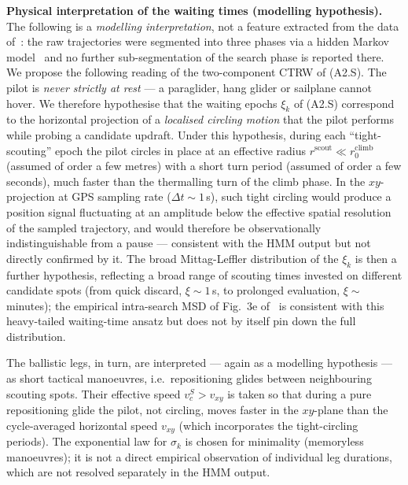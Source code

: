 \documentclass[11pt,a4paper]{article}
\begin{document}
\begin{description}
\begin{description}
\textbf{Physical interpretation of the waiting times
(modelling hypothesis).}
The following is a \emph{modelling interpretation}, not a feature
extracted from the data of~\cite{vilpellet2026}: the raw
trajectories were segmented into three phases via a hidden Markov
model~\cite{rabiner1989} and no further sub-segmentation of the
search phase is reported there. We propose the following reading
of the two-component CTRW of (A2.S). The pilot is \emph{never
strictly at rest} --- a paraglider, hang glider or sailplane
cannot hover. We therefore hypothesise that the waiting epochs
$\xi_k$ of (A2.S) correspond to the horizontal projection of a
\emph{localised circling motion} that the pilot performs while
probing a candidate updraft. Under this hypothesis, during each
``tight-scouting'' epoch the pilot circles in place at an
effective radius $r^{\mathrm{scout}} \ll r_0^{\mathrm{climb}}$
(assumed of order a few metres) with a short turn period (assumed
of order a few seconds), much faster than the thermalling turn of
the climb phase. In the $xy$-projection at GPS sampling rate
($\Delta t \sim 1$\,s), such tight circling would produce a
position signal fluctuating at an amplitude below the effective
spatial resolution of the sampled trajectory, and would therefore
be observationally indistinguishable from a pause --- consistent
with the HMM output but not directly confirmed by it.
The broad Mittag-Leffler distribution of the $\xi_k$ is then a
further hypothesis, reflecting a broad range of scouting times
invested on different candidate spots (from quick discard,
$\xi \sim 1$\,s, to prolonged evaluation, $\xi \sim$ minutes);
the empirical intra-search MSD of Fig.~3e
of~\cite{vilpellet2026} is consistent with this heavy-tailed
waiting-time ansatz but does not by itself pin down the full
distribution.

The ballistic legs, in turn, are interpreted --- again as a
modelling hypothesis --- as short tactical manoeuvres, i.e.\
repositioning glides between neighbouring scouting spots. Their
effective speed $v_c^S > v_{xy}$ is taken so that during a pure
repositioning glide the pilot, not circling, moves faster in the
$xy$-plane than the cycle-averaged horizontal speed $v_{xy}$
(which incorporates the tight-circling periods). The exponential
law for $\sigma_k$ is chosen for minimality (memoryless
manoeuvres); it is not a direct empirical observation of
individual leg durations, which are not resolved separately in
the HMM output.


\end{description}
\end{description}
\end{document}
